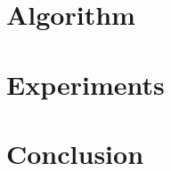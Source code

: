 \documentclass{llncs}
\begin{document}
\section{Algorithm}
\label{sec:algo}

 



\section{Experiments}
\label{sec:experiments}


%


\section{Conclusion}
\label{sec:conclusion}






% 
\end{document}
